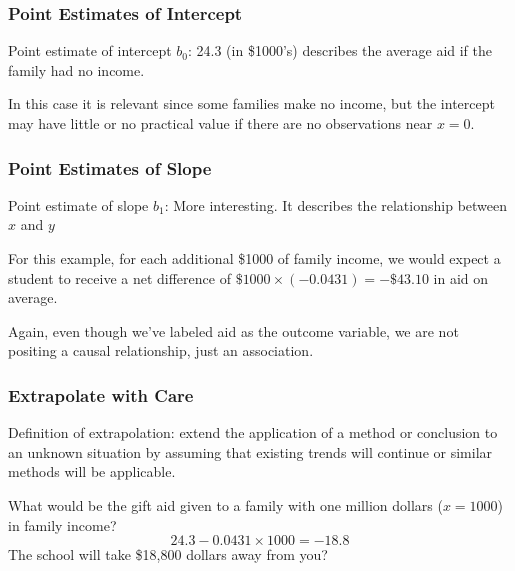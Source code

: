 \documentclass[slides]{beamer}
\newcommand{\blue}[1]{\textcolor{blue2}{#1}}
\begin{document}
\begin{frame}[fragile]
\frametitle{Point Estimates of Intercept}
\blue{Point estimate of intercept $b_0$}: 24.3 (in \$1000's) describes the average aid if the family had no income.  

\vspace{0.25cm}
\pause
In this case it is relevant since some families make no income, but the intercept may have little or no practical value if there are no observations near $x=0$.  

\end{frame}


\begin{frame}[fragile]
\frametitle{Point Estimates of Slope}
\blue{Point estimate of slope $b_1$}: More interesting. It describes the \blue{relationship} between $x$ and $y$

\vspace{0.5cm}
\pause
For this example, for each additional \$1000 of family income, we would \blue{expect} a student to receive a net difference of $\$1000 \times (-0.0431) = -\$43.10$ in aid on average.   

\vspace{0.5cm}
\pause
Again, even though we've labeled aid as the outcome variable, we are not positing a causal relationship, just an association.  


\end{frame}


\begin{frame}[fragile]
\frametitle{Extrapolate with Care}
Definition of \blue{extrapolation}:  extend the application of a method or conclusion to an unknown situation by assuming that existing trends will continue or similar methods will be applicable.

\vspace{0.5cm}
\pause
What would be the gift aid given to a family with one million dollars ($x=1000$) in family income?
\[
24.3 - 0.0431 \times 1000 = -18.8
\]
The school will take \$18,800 dollars away from you?  


\end{frame}
\end{document}
